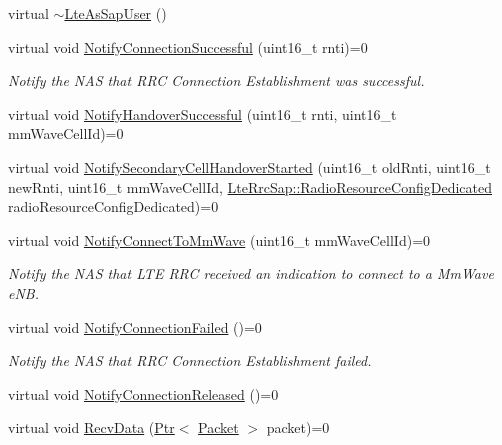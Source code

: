 \begin{DoxyCompactItemize}
\item 
virtual \hyperlink{classns3_1_1LteAsSapUser_a58de2f9283e4bc509c07513e0d18fa68}{$\sim$\+Lte\+As\+Sap\+User} ()
\item 
virtual void \hyperlink{classns3_1_1LteAsSapUser_a78cc4b7b3ff069c3aeaab9a9be86e396}{Notify\+Connection\+Successful} (uint16\+\_\+t rnti)=0
\begin{DoxyCompactList}\small\item\em Notify the N\+AS that R\+RC Connection Establishment was successful. \end{DoxyCompactList}\item 
virtual void \hyperlink{classns3_1_1LteAsSapUser_a53b78b4ee13ac1cbe5403d10b3723d65}{Notify\+Handover\+Successful} (uint16\+\_\+t rnti, uint16\+\_\+t mm\+Wave\+Cell\+Id)=0
\item 
virtual void \hyperlink{classns3_1_1LteAsSapUser_a9690b194850b741627240f3ca5f4a770}{Notify\+Secondary\+Cell\+Handover\+Started} (uint16\+\_\+t old\+Rnti, uint16\+\_\+t new\+Rnti, uint16\+\_\+t mm\+Wave\+Cell\+Id, \hyperlink{structns3_1_1LteRrcSap_1_1RadioResourceConfigDedicated}{Lte\+Rrc\+Sap\+::\+Radio\+Resource\+Config\+Dedicated} radio\+Resource\+Config\+Dedicated)=0
\item 
virtual void \hyperlink{classns3_1_1LteAsSapUser_a80fba605ffcd18a4d1cc23c420231c96}{Notify\+Connect\+To\+Mm\+Wave} (uint16\+\_\+t mm\+Wave\+Cell\+Id)=0
\begin{DoxyCompactList}\small\item\em Notify the N\+AS that L\+TE R\+RC received an indication to connect to a Mm\+Wave e\+NB. \end{DoxyCompactList}\item 
virtual void \hyperlink{classns3_1_1LteAsSapUser_a54158d846375fb6ddce21e51a765bed6}{Notify\+Connection\+Failed} ()=0
\begin{DoxyCompactList}\small\item\em Notify the N\+AS that R\+RC Connection Establishment failed. \end{DoxyCompactList}\item 
virtual void \hyperlink{classns3_1_1LteAsSapUser_abaa7e7c062a605a1f30d3f3f80fb5d7e}{Notify\+Connection\+Released} ()=0
\item 
virtual void \hyperlink{classns3_1_1LteAsSapUser_ae675f4df0a8e1547580be06af7bf036a}{Recv\+Data} (\hyperlink{classns3_1_1Ptr}{Ptr}$<$ \hyperlink{classns3_1_1Packet}{Packet} $>$ packet)=0
\end{DoxyCompactItemize}


